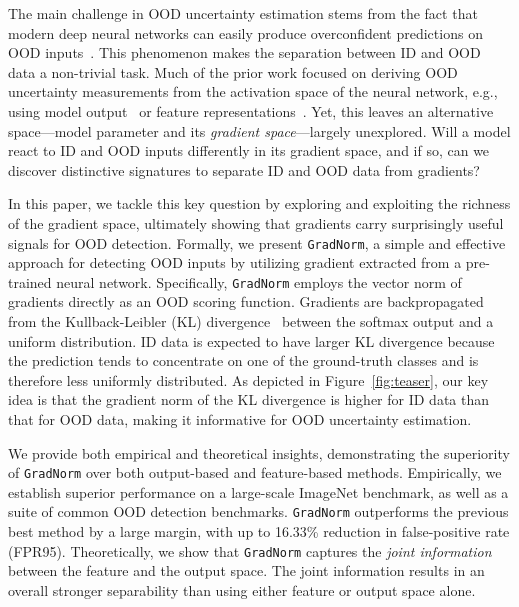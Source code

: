 \documentclass{article}
\begin{document}
The main challenge in OOD uncertainty estimation stems from the fact that modern deep neural networks can easily produce overconfident predictions on OOD inputs~\cite{nguyen2015deep}. This phenomenon makes the separation between ID and OOD data a non-trivial task. Much of the prior work focused on deriving OOD uncertainty measurements from the activation space of the neural network, e.g., using model output~\cite{hendrycks2016baseline, hsu2020generalized,lakshminarayanan2017simple,liang2018enhancing, liu2020energy} or feature representations~\cite{lee2018simple}. Yet, this leaves an alternative space---model {parameter and its \emph{gradient space}}---largely unexplored. Will a model react to ID and OOD inputs differently in its gradient space, and if so, can we discover distinctive signatures to separate ID and OOD data from gradients?











In this paper, we tackle this key question by exploring and exploiting the richness of the {gradient space}, ultimately showing that {gradients} carry surprisingly useful signals for OOD detection. Formally, we present \texttt{GradNorm}, a simple and effective approach for detecting OOD inputs by utilizing gradient extracted from a pre-trained neural network. Specifically, \texttt{GradNorm} employs the vector norm of gradients directly as an OOD scoring function. Gradients are backpropagated from the Kullback-Leibler (KL) divergence~\cite{kullback1951information} between the softmax output and a uniform distribution. ID data is expected to have larger KL divergence because the prediction tends to concentrate on one of the ground-truth classes and  is therefore  less uniformly distributed. 
As depicted in Figure~\ref{fig:teaser}, our key idea is that the gradient norm of the KL divergence is higher for ID data than that for OOD data, making it informative for OOD uncertainty estimation. 

We provide both empirical and theoretical insights, demonstrating the superiority of \texttt{GradNorm} over both output-based and feature-based methods. Empirically, we establish superior performance on a large-scale ImageNet benchmark, as well as a suite of common OOD detection benchmarks. 
\texttt{GradNorm} outperforms the previous best method by a large margin, with up to {16.33}\% reduction in false-positive rate (FPR95). Theoretically, we show that \texttt{GradNorm} captures the \emph{joint information} between the feature and the output space. The joint information results in an overall stronger separability than using either feature or output space alone. 
\end{document}

